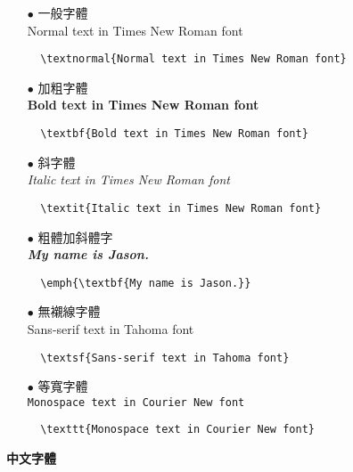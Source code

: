\begin{itemize}
\item[$\bullet$] 一般字體\\
\textnormal{Normal text in Times New Roman font}
    \begin{lstlisting}
  \textnormal{Normal text in Times New Roman font}
	\end{lstlisting}
	
\item[$\bullet$] 加粗字體\\
\textbf{Bold text in Times New Roman font}
	\begin{lstlisting}
  \textbf{Bold text in Times New Roman font}
	\end{lstlisting}
	
\item[$\bullet$] 斜字體\\
\textit{Italic text in Times New Roman font}
    \begin{lstlisting}
  \textit{Italic text in Times New Roman font}
	\end{lstlisting}
	
\item[$\bullet$] 粗體加斜體字\\
\emph{\textbf{My name is Jason.}}
    \begin{lstlisting}
  \emph{\textbf{My name is Jason.}} 
    \end{lstlisting}
    
\item[$\bullet$] 無襯線字體\\
\textsf{Sans-serif text in Tahoma font}
    \begin{lstlisting}
  \textsf{Sans-serif text in Tahoma font}
	\end{lstlisting}
	
\item[$\bullet$] 等寬字體\\
\texttt{Monospace text in Courier New font}
    \begin{lstlisting}
  \texttt{Monospace text in Courier New font}
	\end{lstlisting}
\end{itemize}


\textbf{中文字體}

